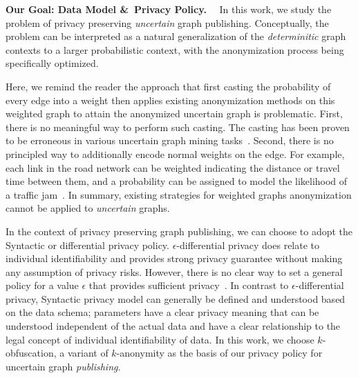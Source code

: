 \textbf{Our Goal: Data Model \&~Privacy Policy.}~~
In this work, we study the problem of privacy preserving \emph{uncertain} graph publishing. Conceptually, the problem can be interpreted as a natural generalization of the \emph{determinitic} graph contexts to a larger probabilistic context, with the anonymization process being specifically optimized. 

Here, we remind the reader the approach that first casting the probability of every edge into a weight then applies existing anonymization methods on this weighted graph to attain the anonymized uncertain graph is problematic. First, there is no meaningful way to perform such casting. The casting has been proven to be erroneous in various uncertain graph mining tasks~\cite{Potamias_K_2010,Zhao_Detecting_2014}. Second, there is no principled way to additionally encode normal weights on the edge. For example, each link in the road network can be weighted indicating the distance or travel time between them, and a probability can be assigned to model the likelihood of a traffic jam~\cite{Jin_Distance_2011}. In summary, existing strategies for weighted graphs anonymization cannot be applied to \emph{uncertain} graphs.

In the context of privacy preserving graph publishing, we can choose to adopt the Syntactic or differential privacy policy.
$\epsilon$-differential privacy does relate to individual identifiability and provides strong privacy guarantee without making any assumption of privacy risks. However, there is no clear way to set a general policy for a value $\epsilon$ that provides sufficient privacy~\cite{lee2011}. In contrast to $\epsilon$-differential privacy, Syntactic privacy model can generally be defined and understood based on the data schema; parameters have a clear privacy meaning that can be understood independent of the actual data and have a clear relationship to the legal concept of individual identifiability of data. In this work, we choose $k$-obfuscation, a variant of $k$-anonymity as the basis of our privacy policy for uncertain graph \emph{publishing}.

